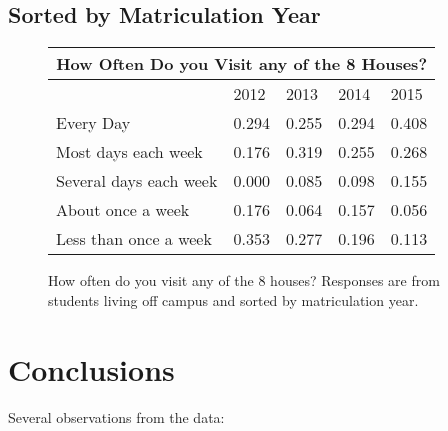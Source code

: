 \documentclass[12pt]{article} %
\begin{document}
\subsection{Sorted by Matriculation Year}
\vspace{-5mm}
\begin{figure}[H]
\begin{center}
\begin{tabular}{|m{6 cm}|m{1.7 cm}|m{1.7 cm}|m{1.7 cm}|m{1.7 cm} |}
\hline
\multicolumn{5}{|c|}{How Often Do you Visit any of the 8 Houses?}\\ \hline
& 2012& 2013& 2014& 2015\\ \hline
Every Day   &  0.294 &  0.255 &  0.294 &  0.408\\ \hline
Most days each week   &  0.176 &  0.319 &  0.255 &  0.268\\ \hline
Several days each week   &  0.000 &  0.085 &  0.098 &  0.155\\ \hline
About once a week   &  0.176 &  0.064 &  0.157 &  0.056\\ \hline
Less than once a week   &  0.353 &  0.277 &  0.196 &  0.113\\ \hline
\end{tabular}
\end{center}
	\caption{How often do you visit any of the 8 houses? Responses are from students living off campus and sorted by matriculation year.}

\end{figure}

\newpage
\section{Conclusions}
Several observations from the data:
\end{document}

